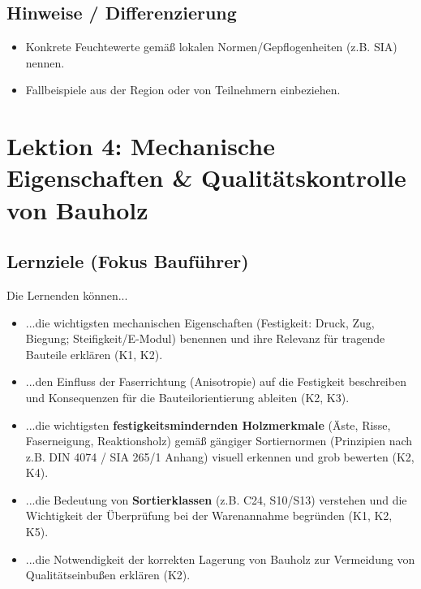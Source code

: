 \documentclass[12pt, a4paper]{article}
\begin{document}
\subsection{Hinweise / Differenzierung}
\begin{itemize}
    \item Konkrete Feuchtewerte gemäß lokalen Normen/Gepflogenheiten (z.B. SIA) nennen.
    \item Fallbeispiele aus der Region oder von Teilnehmern einbeziehen.
\end{itemize}

\newpage

\section{Lektion 4: Mechanische Eigenschaften \& Qualitätskontrolle von Bauholz}
\subsection{Lernziele (Fokus Bauführer)}
Die Lernenden können...
\begin{itemize}
    \item ...die wichtigsten mechanischen Eigenschaften (Festigkeit: Druck, Zug, Biegung; Steifigkeit/E-Modul) benennen und ihre Relevanz für tragende Bauteile erklären (K1, K2).
    \item ...den Einfluss der Faserrichtung (Anisotropie) auf die Festigkeit beschreiben und Konsequenzen für die Bauteilorientierung ableiten (K2, K3).
    \item ...die wichtigsten \textbf{festigkeitsmindernden Holzmerkmale} (Äste, Risse, Faserneigung, Reaktionsholz) gemäß gängiger Sortiernormen (Prinzipien nach z.B. DIN 4074 / SIA 265/1 Anhang) visuell erkennen und grob bewerten (K2, K4).
    \item ...die Bedeutung von \textbf{Sortierklassen} (z.B. C24, S10/S13) verstehen und die Wichtigkeit der Überprüfung bei der Warenannahme begründen (K1, K2, K5).
    \item ...die Notwendigkeit der korrekten Lagerung von Bauholz zur Vermeidung von Qualitätseinbußen erklären (K2).
\end{itemize}
\end{document}
